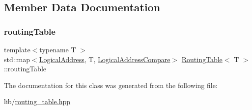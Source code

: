 \subsection{Member Data Documentation}
\mbox{\label{classRoutingTable_ad348863258a92ca89d4150ca6f20aabb}} 
\subsubsection{\texorpdfstring{routing\+Table}{routingTable}}
{\footnotesize\ttfamily template$<$typename T $>$ \\
std\+::map$<$\hyperlink{structLogicalAddress}{Logical\+Address}, T, \hyperlink{structLogicalAddressCompare}{Logical\+Address\+Compare}$>$ \hyperlink{classRoutingTable}{Routing\+Table}$<$ T $>$\+::routing\+Table\hspace{0.3cm}{\ttfamily [protected]}}



The documentation for this class was generated from the following file\+:\begin{DoxyCompactItemize}
\item 
lib/\hyperlink{routing__table_8hpp}{routing\+\_\+table.\+hpp}\end{DoxyCompactItemize}
